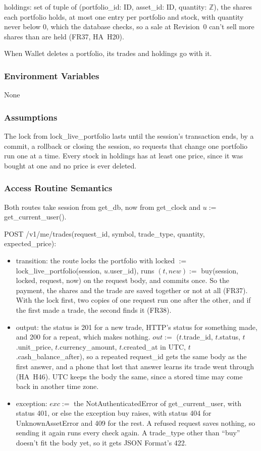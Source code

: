 \documentclass[12pt, titlepage]{article}
\begin{document}
\medskip
\noindent holdings: set of tuple of (portfolio\_id: ID, asset\_id: ID,
quantity: $\mathbb{Z}$), the shares each portfolio holds, at most one entry per
portfolio and stock, with quantity never below 0, which the database checks,
so a sale at Revision~0 can't sell more shares than are held (FR37, HA~H20).

\medskip
\noindent When Wallet deletes a portfolio, its trades and holdings go with it.

\subsubsection{Environment Variables}

None

\subsubsection{Assumptions}

The lock from lock\_live\_portfolio lasts until the session's transaction ends,
by a commit, a rollback or closing the session, so requests that change one
portfolio run one at a time. Every stock in holdings has at least one price,
since it was bought at one and no price is ever deleted.

\subsubsection{Access Routine Semantics}

\noindent Both routes take session from get\_db, now from get\_clock and $u :=$
get\_current\_user().

\medskip
\noindent POST /v1/me/trades(request\_id, symbol, trade\_type, quantity,
expected\_price):
\begin{itemize}
\item transition: the route locks the portfolio with locked $:=$
  lock\_live\_portfolio(session, $u$.user\_id), runs $(t, \mathit{new}) :=$
  buy(session, locked, request, now) on the request body, and commits once. So
  the payment, the shares and the trade are saved together or not at all
  (FR37). With the lock first, two copies of one request run one after the
  other, and if the first made a trade, the second finds it (FR38).
\item output: the status is 201 for a new trade, HTTP's status for something
  made, and 200 for a repeat, which makes nothing. $out :=$ ($t$.trade\_id,
  $t$.status, $t$.unit\_price, $t$.currency\_amount, $t$.created\_at in UTC,
  $t$.cash\_balance\_after), so a repeated request\_id gets the same body as
  the first answer, and a phone that lost that answer learns its trade went
  through (HA~H46). UTC keeps the body the same, since a stored time may come
  back in another time zone.
\item exception: $exc :=$ the NotAuthenticatedError of get\_current\_user,
  with status 401, or else the exception buy raises, with status 404 for
  UnknownAssetError and 409 for the rest. A refused request saves nothing, so
  sending it again runs every check again. A trade\_type other than ``buy''
  doesn't fit the body yet, so it gets JSON Format's 422.
\end{itemize}
\end{document}
